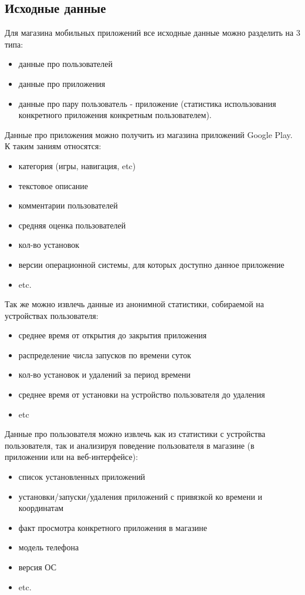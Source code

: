 \documentclass[12pt,a4paper]{report}
\begin{document}
\subsection{Исходные данные}
Для магазина мобильных приложений все исходные данные можно разделить на 3 типа:
\begin{itemize}
\item данные про пользователей
\item данные про приложения
\item данные про пару пользователь - приложение (статистика использования конкретного приложения конкретным пользователем).
\end{itemize}
Данные про приложения можно получить из магазина приложений Google Play. К таким заниям относятся:
\begin{itemize}
\item категория (игры, навигация, etc)
\item текстовое описание
\item комментарии пользователей
\item средняя оценка пользователей
\item кол-во установок
\item версии операционной системы, для которых доступно данное приложение
\item etc.
\end{itemize}
Так же можно извлечь данные из анонимной статистики, собираемой на устройствах пользователя:
\begin{itemize}
\item среднее время от открытия до закрытия приложения
\item распределение числа запусков по времени суток
\item кол-во установок и удалений за период времени
\item среднее время от установки на устройство пользователя до удаления
\item etc
\end{itemize}
Данные про пользователя можно извлечь как из статистики с устройства пользователя, так и анализируя поведение пользователя в магазине (в приложении или на веб-интерфейсе):
\begin{itemize}
\item список установленных приложений
\item установки/запуски/удаления приложений с привязкой ко времени и координатам
\item факт просмотра конкретного приложения в магазине
\item модель телефона
\item версия ОС
\item etc.
\end{itemize}
\end{document}
